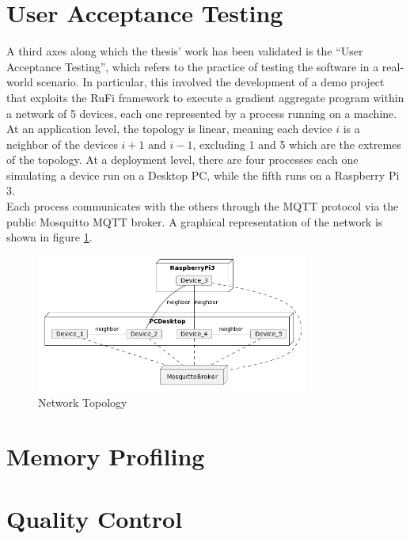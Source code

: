 

\section{User Acceptance Testing}
A third axes along which the thesis' work has been validated is the ``User Acceptance Testing'', which refers to the practice of testing the software in a real-world scenario.
In particular, this involved the development of a demo project that exploits the RuFi framework to execute a gradient aggregate program within a network of 5 devices, each one
represented by a process running on a machine. At an application level, the topology is linear, meaning each device $i$ is a neighbor of the devices $i+1$ and $i-1$, excluding 1 and 5
which are the extremes of the topology. At a deployment level, there are four processes each one simulating a device run on a Desktop PC, while the fifth runs on a Raspberry Pi 3.\\
Each process communicates with the others through the MQTT protocol via the public Mosquitto MQTT broker. A graphical representation of the network is shown in figure \ref{fig:network_topology}.

\begin{figure}[ht!]
    \centering
    \includegraphics[width=0.8\textwidth]{figures/diagrams/img/deployment-demo.png}
    \caption{Network Topology}
    \label{fig:network_topology}
\end{figure}

\section{Memory Profiling}

\section{Quality Control}
